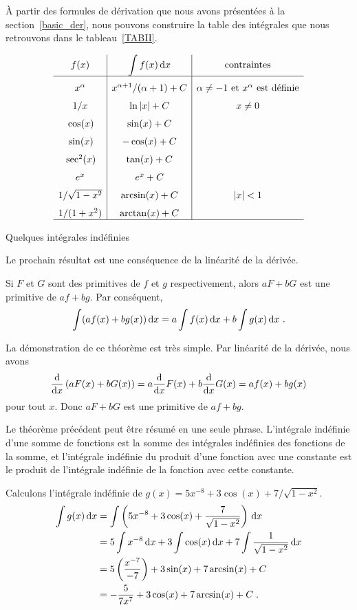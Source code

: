 {À partir des formules de dérivation que nous avons présentées à la
section~\ref{basic_der}, nous pouvons construire la table des intégrales
que nous retrouvons dans le tableau~\ref{TABII}.

\begin{table}
\[
\begin{array}{c|c|cl}
f(x) & \displaystyle \int f(x)\dx{x} & \text{contraintes} \\
\hline
\rule{0em}{1.5em} x^\alpha & x^{\alpha+1}/(\alpha+1) + C &
\alpha \neq -1 \ \text{et}\ x^\alpha\ \text{est définie} \\ 
\rule{0em}{1.5em} 1/x & \ln|x| + C & x \neq 0 \\
\rule{0em}{1.5em} \cos(x) & \sin(x) + C & \\
\rule{0em}{1.5em} \sin(x) & -\cos(x) + C & \\
\rule{0em}{1.5em} \sec^2(x) & \tan(x) + C & \\
\rule{0em}{1.5em} e^x & e^x + C & \\
\rule{0em}{1.5em} 1/\sqrt{1-x^2} & \arcsin(x) + C & |x|<1 \\
\rule{0em}{1.5em} 1/(1+x^2) & \arctan(x) + C & \\
\hline
\end{array}
\]
\caption{Quelques intégrales indéfinies \label{TABII}}
\end{table}

Le prochain résultat est une conséquence de la linéarité de la
dérivée.

\begin{theorem}
Si $F$ et $G$ sont des primitives de $f$ et $g$ respectivement, alors
$a F + b G$ est une primitive de $a f + b g$.  Par conséquent,
\[
\int (a f(x) + b g(x)) \dx{x} = a \int f(x) \dx{x}
+ b \int g(x) \dx{x} \ .
\]
\end{theorem}

La démonstration de ce théorème est très simple.  Par linéarité de la
dérivée, nous avons
\[
\dfdx{\left(a F(x) + b G(x)\right)}{x}
= a \dfdx{F(x)}{x} + b \dfdx{G(x)}{x}
= a f(x) + b g(x)
\]
pour tout $x$.  Donc $aF+bG$ est une primitive de $af + bg$.  

Le théorème précédent peut être résumé en une seule phrase.
L'intégrale indéfinie d'une somme de fonctions est la somme des
intégrales indéfinies des fonctions de la somme, et l'intégrale
indéfinie du produit d'une fonction avec une constante est le produit
de l'intégrale indéfinie de la fonction avec cette constante. 

\begin{egg}
Calculons l'intégrale indéfinie de
$g(x) = 5 x^{-8} + 3 \cos(x) + 7/\sqrt{1-x^2}$.
\begin{align*}
\int g(x)\dx{x} &=
\int \left(5 x^{-8} + 3 \cos(x) + \frac{7}{\sqrt{1-x^2}} \right)\dx{x} \\
&= 5 \int x^{-8} \dx{x} + 3 \int \cos(x)\dx{x}
+ 7 \int \frac{1}{\sqrt{1-x^2}}\dx{x}  \\
&= 5 \left( \frac{x^{-7}}{-7}\right) + 3 \sin(x) + 7 \arcsin(x) + C\\
&= -\frac{5}{7x^7} + 3\cos(x) + 7 \arcsin(x) + C \; .
\end{align*}
\end{egg}

}
